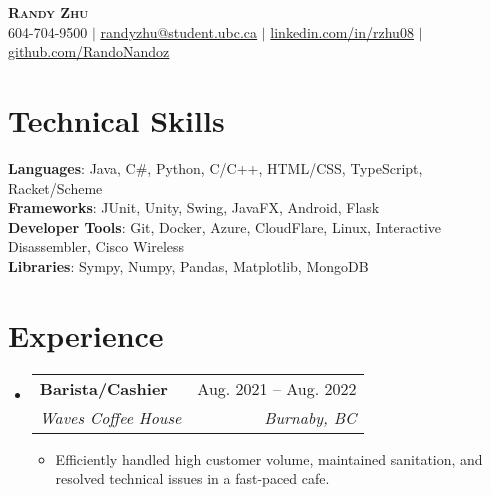 \documentclass[letterpaper,11pt]{article}
\makeatletter
\newcommand{\resumeItem}[1]{
  \item\small{
    {#1 \vspace{-2pt}}
  }
}
\newcommand{\resumeSubheading}[4]{
  \vspace{-2pt}\item
    \begin{tabular*}{0.97\textwidth}[t]{l@{\extracolsep{\fill}}r}
      \textbf{#1} & #2 \\
      \textit{\small#3} & \textit{\small #4} \\
    \end{tabular*}\vspace{-7pt}
}
\newcommand{\resumeSubHeadingListStart}{\begin{itemize}[leftmargin=0.15in, label={}]}
\newcommand{\resumeSubHeadingListEnd}{\end{itemize}}
\newcommand{\resumeItemListStart}{\begin{itemize}}
\newcommand{\resumeItemListEnd}{\end{itemize}\vspace{-5pt}}
\makeatother
\begin{document}

\begin{center}
  \textbf{\Huge \scshape Randy Zhu} \\ \vspace{1pt}
  \small 604-704-9500 $|$ \href{mailto:randyzhu@student.ubc.ca}{\underline{randyzhu@student.ubc.ca}} $|$
  \href{https://www.linkedin.com/in/rzhu08/}{{linkedin.com/in/rzhu08}} $|$
  \href{https://github.com/RandoNandoz}{\underline{github.com/RandoNandoz}}
\end{center}

%
\section{Technical Skills}
\begin{itemize}[leftmargin=0.15in, label={}]
  \small{\item{
        \textbf{Languages}{: Java, C\#, Python, C/C++, HTML/CSS, TypeScript, Racket/Scheme} \\
        \textbf{Frameworks}{: JUnit, Unity, Swing, JavaFX, Android, Flask} \\
        \textbf{Developer Tools}{: Git, Docker, Azure, CloudFlare, Linux, Interactive Disassembler, Cisco Wireless} \\
        \textbf{Libraries}{: Sympy, Numpy, Pandas, Matplotlib, MongoDB}
        }}
\end{itemize}

\section{Experience}
\resumeSubHeadingListStart

\resumeSubheading
{Barista/Cashier}{Aug. 2021 -- Aug. 2022}
{Waves Coffee House}{Burnaby, BC}
\resumeItemListStart
\resumeItem{Efficiently handled high customer volume, maintained sanitation, and resolved technical issues in a fast-paced cafe.}
\resumeItemListEnd
\resumeSubHeadingListEnd
\end{document}

